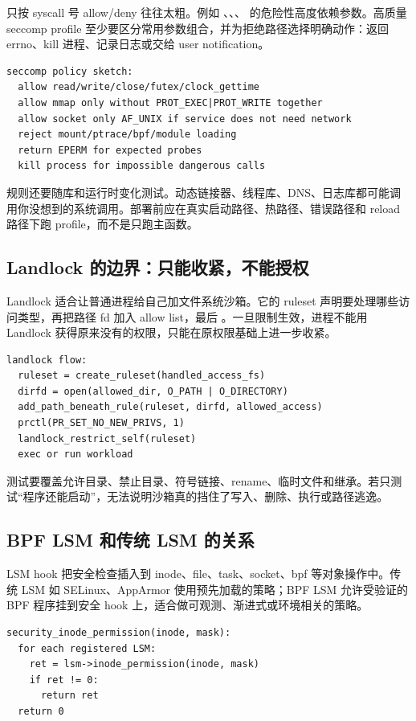 只按 syscall 号 allow/deny 往往太粗。例如 、、、 的危险性高度依赖参数。高质量 seccomp profile 至少要区分常用参数组合，并为拒绝路径选择明确动作：返回 errno、kill 进程、记录日志或交给 user notification。

\begin{lstlisting}
seccomp policy sketch:
  allow read/write/close/futex/clock_gettime
  allow mmap only without PROT_EXEC|PROT_WRITE together
  allow socket only AF_UNIX if service does not need network
  reject mount/ptrace/bpf/module loading
  return EPERM for expected probes
  kill process for impossible dangerous calls
\end{lstlisting}

规则还要随库和运行时变化测试。动态链接器、线程库、DNS、日志库都可能调用你没想到的系统调用。部署前应在真实启动路径、热路径、错误路径和 reload 路径下跑 profile，而不是只跑主函数。

\subsection{Landlock 的边界：只能收紧，不能授权}

Landlock 适合让普通进程给自己加文件系统沙箱。它的 ruleset 声明要处理哪些访问类型，再把路径 fd 加入 allow list，最后 。一旦限制生效，进程不能用 Landlock 获得原来没有的权限，只能在原权限基础上进一步收紧。

\begin{lstlisting}
landlock flow:
  ruleset = create_ruleset(handled_access_fs)
  dirfd = open(allowed_dir, O_PATH | O_DIRECTORY)
  add_path_beneath_rule(ruleset, dirfd, allowed_access)
  prctl(PR_SET_NO_NEW_PRIVS, 1)
  landlock_restrict_self(ruleset)
  exec or run workload
\end{lstlisting}

测试要覆盖允许目录、禁止目录、符号链接、rename、临时文件和继承。若只测试“程序还能启动”，无法说明沙箱真的挡住了写入、删除、执行或路径逃逸。

\subsection{BPF LSM 和传统 LSM 的关系}

LSM hook 把安全检查插入到 inode、file、task、socket、bpf 等对象操作中。传统 LSM 如 SELinux、AppArmor 使用预先加载的策略；BPF LSM 允许受验证的 BPF 程序挂到安全 hook 上，适合做可观测、渐进式或环境相关的策略。

\begin{lstlisting}
security_inode_permission(inode, mask):
  for each registered LSM:
    ret = lsm->inode_permission(inode, mask)
    if ret != 0:
      return ret
  return 0
\end{lstlisting}

